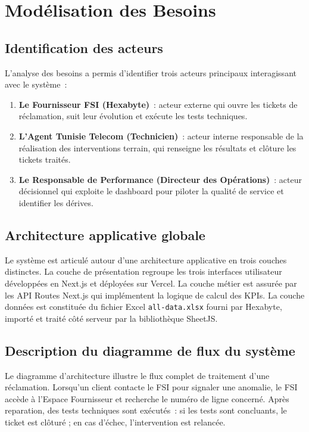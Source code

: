 \documentclass[11pt,a4paper]{report}
\begin{document}
\section{Modélisation des Besoins}

\subsection{Identification des acteurs}

L'analyse des besoins a permis d'identifier trois acteurs principaux interagissant avec le système~:

\begin{enumerate}
  \item \textbf{Le Fournisseur FSI (Hexabyte)}~: acteur externe qui ouvre les tickets de réclamation, suit leur évolution et exécute les tests techniques.
  \item \textbf{L'Agent Tunisie Telecom (Technicien)}~: acteur interne responsable de la réalisation des interventions terrain, qui renseigne les résultats et clôture les tickets traités.
  \item \textbf{Le Responsable de Performance (Directeur des Opérations)}~: acteur décisionnel qui exploite le dashboard pour piloter la qualité de service et identifier les dérives.
\end{enumerate}

\subsection{Architecture applicative globale}

Le système est articulé autour d'une architecture applicative en trois couches distinctes. La couche de présentation regroupe les trois interfaces utilisateur développées en Next.js et déployées sur Vercel. La couche métier est assurée par les API Routes Next.js qui implémentent la logique de calcul des KPIs. La couche données est constituée du fichier Excel \texttt{all-data.xlsx} fourni par Hexabyte, importé et traité côté serveur par la bibliothèque SheetJS.

\subsection{Description du diagramme de flux du système}

Le diagramme d'architecture illustre le flux complet de traitement d'une réclamation. Lorsqu'un client contacte le FSI pour signaler une anomalie, le FSI accède à l'Espace Fournisseur et recherche le numéro de ligne concerné. Après reparation, des tests techniques sont exécutés~: si les tests sont concluants, le ticket est clôturé ; en cas d'échec, l'intervention est relancée.
\end{document}
